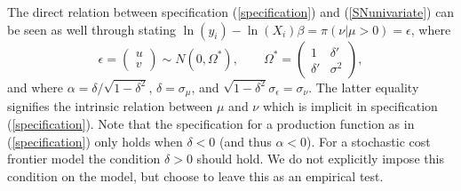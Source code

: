 \documentclass[11pt,parskip,abstracton,notitlepage]{scrartcl}
\begin{document}
The direct relation between specification (\ref{specification}) and (\ref{SNunivariate}) can be seen as well through stating $\ln \left(y_i\right)  -\ln \left(X_i\right) \beta = \pi(\nu|\mu>0) = \epsilon$, where 
%
\begin{equation}
\epsilon =  \begin{pmatrix} u \\ v \end{pmatrix} \sim N\left(0,\Omega^\ast\right), \qquad \Omega^\ast=\begin{pmatrix} 1 & \delta' \\ \delta' & \sigma^2
\end{pmatrix}, 
\end{equation}
%
and where $\alpha = \delta/\sqrt{1-\delta^2}$, $\delta = \sigma_\mu$, and $\sqrt{1-\delta^2} \sigma_\epsilon=\sigma_\nu$. The latter equality signifies the intrinsic relation between $\mu$ and $\nu$ which is implicit in specification (\ref{specification}). Note that the specification for a production function as in  (\ref{specification}) only holds when $\delta < 0$ (and thus $\alpha < 0$). For a stochastic cost frontier model the condition $\delta >0$ should hold. We do not explicitly impose this condition on the model, but choose to leave this as an empirical test. 
\end{document}
